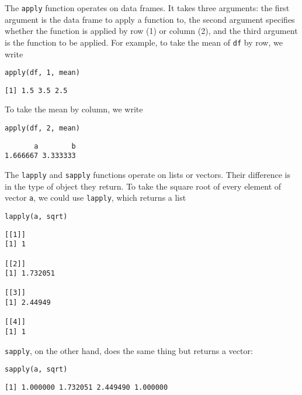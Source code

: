 \documentclass[11pt,a4paper]{article}
\begin{document}
The \texttt{apply} function operates on data frames. It takes three arguments: the first argument is the data frame to apply a function to, the second argument specifies whether the function is applied by row (1) or column (2), and the third argument is the function to be applied. For example, to take the mean of \texttt{df} by row, we write \\

\begin{verbatim}
apply(df, 1, mean)
\end{verbatim}

\begin{verbatim}
[1] 1.5 3.5 2.5
\end{verbatim}

To take the mean by column, we write \\

\begin{verbatim}
apply(df, 2, mean)
\end{verbatim}

\begin{verbatim}
       a        b 
1.666667 3.333333
\end{verbatim}

The \texttt{lapply} and \texttt{sapply} functions operate on lists or vectors. Their difference is in the type of object they return. To take the square root of every element of vector \texttt{a}, we could use \texttt{lapply}, which returns a list \\

\begin{verbatim}
lapply(a, sqrt)
\end{verbatim}

\begin{verbatim}
[[1]]
[1] 1

[[2]]
[1] 1.732051

[[3]]
[1] 2.44949

[[4]]
[1] 1
\end{verbatim}

\texttt{sapply}, on the other hand, does the same thing but returns a vector: \\

\begin{verbatim}
sapply(a, sqrt)
\end{verbatim}

\begin{verbatim}
[1] 1.000000 1.732051 2.449490 1.000000
\end{verbatim}
\end{document}
